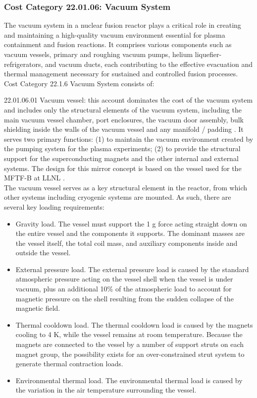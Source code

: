 \subsubsection*{Cost Category 22.01.06: Vacuum System}

The vacuum system in a nuclear fusion reactor plays a critical role in creating and maintaining a high-quality vacuum environment essential for plasma containment and fusion reactions. It comprises various components such as vacuum vessels, primary and roughing vacuum pumps, helium liquefier-refrigerators, and vacuum ducts, each contributing to the effective evacuation and thermal management necessary for sustained and controlled fusion processes. Cost Category 22.1.6 Vacuum System consists of:  

22.01.06.01 Vacuum vessel: this account dominates the cost of the vacuum system and includes only the structural elements of the vacuum system, including the main vacuum vessel chamber, port enclosures, the vacuum door assembly, bulk shielding inside the walls of the vacuum vessel and any manifold / padding \cite{waganer2006design}. It serves two primary functions: (1) to maintain the vacuum environment created by the pumping system for the plasma experiments; (2) to provide the structural support for the superconducting magnets and the other internal and external systems. The design for this mirror concept is based on the vessel used for the MFTF-B at LLNL \cite{gerich1986design}. \\

The vacuum vessel serves as a  key structural element in the reactor, from which other systems including cryogenic systems are mounted.  As such, there are several key loading requirements:

\begin{itemize}
    \item Gravity load. The vessel must support the 1 g force acting straight down on the entire vessel and the components it supports. The dominant masses are the vessel itself, the total coil mass, and auxiliary components inside and outside the vessel.

    \item External pressure load. The external pressure load is caused by the standard atmospheric pressure acting on the vessel shell when the vessel is under vacuum, plus an additional 10\% of the atmospheric load to account for magnetic  pressure on the shell resulting from the sudden collapse of the magnetic field. 

    \item Thermal cooldown load. The thermal cooldown load is  caused by the magnets cooling to 4 K, while the vessel remains at room temperature. Because the magnets are connected to the vessel by a number of support struts on each  magnet group, the possibility exists for an over-constrained  strut system to generate thermal contraction loads.

    \item Environmental thermal load. The environmental thermal load is caused by the variation in the air temperature surrounding the vessel.

\end{itemize}

